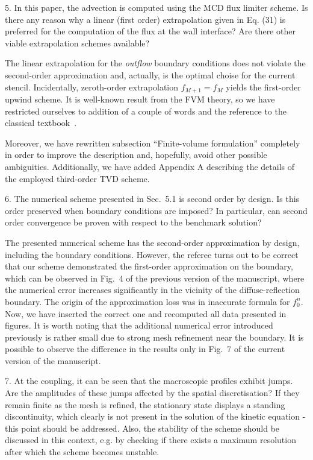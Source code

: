 \documentclass{article}
\begin{document}
\begin{quoting}
    5. In this paper, the advection is computed using
    the MCD flux limiter scheme. Is there any reason why
    a linear (first order) extrapolation given in
    Eq. (31) is preferred for the computation of the
    flux at the wall interface? Are there other viable
    extrapolation schemes available?
\end{quoting}

The linear extrapolation for the \emph{outflow} boundary conditions
does not violate the second-order approximation
and, actually, is the optimal choise for the current stencil.
Incidentally, zeroth-order extrapolation \(f_{M+1} = f_M\) yields
the first-order upwind scheme. It is well-known result from the FVM theory,
so we have restricted ourselves to addition of a couple of words
and the reference to the classical textbook~\cite{LeVeque2002}.

Moreover, we have rewritten subsection ``Finite-volume formulation'' completely
in order to improve the description and, hopefully, avoid other possible ambiguities.
Additionally, we have added Appendix A describing the details of the employed third-order TVD scheme.

\begin{quoting}
    6. The numerical scheme presented in Sec.~5.1 is
    second order by design. Is this order preserved
    when boundary conditions are imposed? In particular,
    can second order convergence be proven with respect
    to the benchmark solution?
\end{quoting}

The presented numerical scheme has the second-order approximation by design,
including the boundary conditions.
However, the referee turns out to be correct that our scheme demonstrated the first-order approximation
on the boundary, which can be observed in Fig.~4 of the previous version of the manuscript,
where the numerical error increases significantly in the vicinity of the diffuse-reflection boundary.
The origin of the approximation loss was in inaccurate formula for \(f^n_0\).
Now, we have inserted the correct one and recomputed all data presented in figures.
It is worth noting that the additional numerical error introduced previously is rather small
due to strong mesh refinement near the boundary. It is possible to observe the difference
in the results only in Fig.~7 of the current version of the manuscript.

\begin{quoting}
    7. At the coupling, it can be seen that the
    macroscopic profiles exhibit jumps. Are the
    amplitudes of these jumps affected by the spatial
    discretisation? If they remain finite as the
    mesh is refined, the stationary state displays
    a standing discontinuity, which clearly is not
    present in the solution of the kinetic equation -
    this point should be addressed. Also, the stability
    of the scheme should be discussed in this context,
    e.g. by checking if there exists a maximum
    resolution after which the scheme becomes unstable.
\end{quoting}
\end{document}
